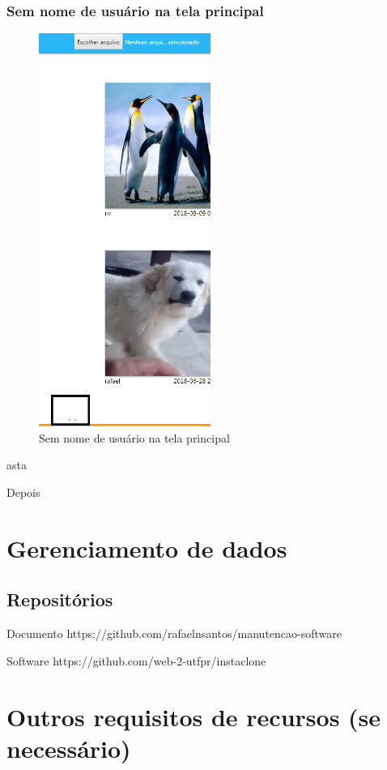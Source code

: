\subsubsection{Sem nome de usuário na tela principal}
\begin{figure}[ht]
	\centering
	\includegraphics[width=0.5\textwidth]{./imagens/paginas.png}
	\caption{Sem nome de usuário na tela principal}
	\label{fig:casoDeUso}
\end{figure}
asta
\pagebreak

Depois


\section{Gerenciamento de dados}

\subsection{Repositórios}
Documento
https://github.com/rafaelnsantos/manutencao-software

Software
https://github.com/web-2-utfpr/instaclone

\section{Outros requisitos de recursos (se necessário)}
